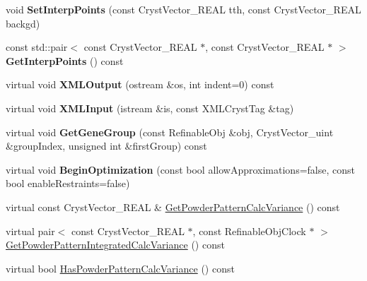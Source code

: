 \begin{DoxyCompactItemize}
void {\bfseries Set\+Interp\+Points} (const Cryst\+Vector\+\_\+\+R\+E\+AL tth, const Cryst\+Vector\+\_\+\+R\+E\+AL backgd)
\item 
\mbox{\label{class_obj_cryst_1_1_powder_pattern_background_aaf33dff056fd0e0b0c0876217bce1040}} 
const std\+::pair$<$ const Cryst\+Vector\+\_\+\+R\+E\+AL $\ast$, const Cryst\+Vector\+\_\+\+R\+E\+AL $\ast$ $>$ {\bfseries Get\+Interp\+Points} () const
\item 
\mbox{\label{class_obj_cryst_1_1_powder_pattern_background_a66d1d585be7efa8d106d322ba94bef7b}} 
virtual void {\bfseries X\+M\+L\+Output} (ostream \&os, int indent=0) const
\item 
\mbox{\label{class_obj_cryst_1_1_powder_pattern_background_af854b053de7dd03c68fd7b4b14132177}} 
virtual void {\bfseries X\+M\+L\+Input} (istream \&is, const X\+M\+L\+Cryst\+Tag \&tag)
\item 
\mbox{\label{class_obj_cryst_1_1_powder_pattern_background_a6948dbcc1d4c17de5de063625e73da05}} 
virtual void {\bfseries Get\+Gene\+Group} (const Refinable\+Obj \&obj, Cryst\+Vector\+\_\+uint \&group\+Index, unsigned int \&first\+Group) const
\item 
\mbox{\label{class_obj_cryst_1_1_powder_pattern_background_a5bd1253bc1a4bd1e1a6e6459c670fd52}} 
virtual void {\bfseries Begin\+Optimization} (const bool allow\+Approximations=false, const bool enable\+Restraints=false)
\item 
virtual const Cryst\+Vector\+\_\+\+R\+E\+AL \& \mbox{\hyperlink{class_obj_cryst_1_1_powder_pattern_background_a75c931bd3e0370e7434f75d70ba51295}{Get\+Powder\+Pattern\+Calc\+Variance}} () const
\item 
virtual pair$<$ const Cryst\+Vector\+\_\+\+R\+E\+AL $\ast$, const Refinable\+Obj\+Clock $\ast$ $>$ \mbox{\hyperlink{class_obj_cryst_1_1_powder_pattern_background_a8ccebd7f0a71a7994c60b6efb2b8ebc7}{Get\+Powder\+Pattern\+Integrated\+Calc\+Variance}} () const
\item 
virtual bool \mbox{\hyperlink{class_obj_cryst_1_1_powder_pattern_background_a126f036fe66797c52c7e362663925ad9}{Has\+Powder\+Pattern\+Calc\+Variance}} () const

\end{DoxyCompactItemize}
